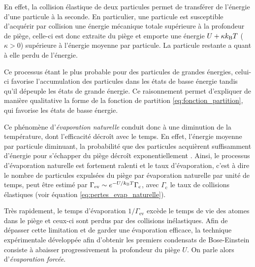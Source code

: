En effet, la collision élastique de deux particules permet de transférer de l'énergie d'une particule à la seconde. En particulier, une particule est susceptible d'acquérir par collision une énergie mécanique totale supérieure à la profondeur de piège, celle-ci est donc extraite du piège et emporte une énergie $U+\kappa k_{\mathrm{B}} T$ ($\kappa>0$) supérieure à l'énergie moyenne par particule. La particule restante a quant à elle perdu de l'énergie. 

Ce processus étant le plus probable pour des particules de grandes énergies, celui-ci favorise l'accumulation des particules dans les états de basse énergie tandis qu'il dépeuple les états de grande énergie. Ce raisonnement permet d'expliquer de manière qualitative la forme de la fonction de partition \ref{eq:fonction_partition}, qui favorise les états de basse énergie.

Ce phénomène d'\emph{évaporation naturelle} conduit donc à une diminution de la température, dont l'efficacité décroît avec le temps. En effet, l'énergie moyenne par particule diminuant, la probabilité que des particules acquièrent suffisamment d'énergie pour s'échapper du piège décroît exponentiellement \citep{walraven2010elements}. Ainsi, le processus d'évaporation naturelle est fortement ralenti et le taux d'évaporation, c'est à dire le nombre de particules expulsées du piège par évaporation naturelle par unité de temps, peut être estimé par $\Gamma_{\mathrm{ev}}\sim e^{-U/k_{\mathrm{B}} T} \Gamma_{\mathrm{c}}$, avec $\Gamma_{\mathrm{c}}$ le taux de collisions élastiques (voir équation \ref{eq:pertes_evap_naturelle}).

Très rapidement, le temps d'évaporation $1/\Gamma_{\mathrm{ev}}$ excède le temps de vie des atomes dans le piège et ceux-ci sont perdus par des collisions inélastiques. Afin de dépasser cette limitation et de garder une évaporation efficace, la technique expérimentale développée afin d'obtenir les premiers condensats de Bose-Einstein consiste à abaisser progressivement la profondeur du piège $U$. On parle alors d'\emph{évaporation forcée}.





